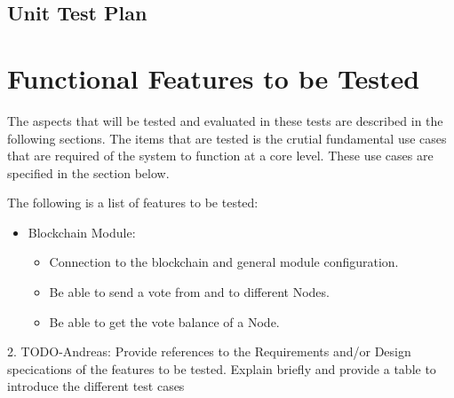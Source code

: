 \documentclass[11pt]{article}
\begin{document}
	\begin{center}
		\section*{Unit Test Plan}
	\end{center}
	
	\section{Functional Features to be Tested}
	\label{sec:FunctionalFeaturesToBeTested}
	The aspects that will be tested and evaluated in these tests are described in the following sections. The items that are tested is the crutial fundamental use cases that are required of the system to function at a core level. These use cases are specified in the section below.\newline
	
	The following is a list of features to be tested:
	\begin{itemize}
		\item Blockchain Module:
		\begin{itemize}
			\item Connection to the blockchain and general module configuration.
			\item Be able to send a vote from and to different Nodes.
			\item Be able to get the vote balance of a Node.
		\end{itemize}
	\end{itemize}
	2. TODO-Andreas: Provide references to the Requirements and/or Design specications of the features to be tested. Explain briefly and provide a table to introduce the different test cases
	
\end{document}
